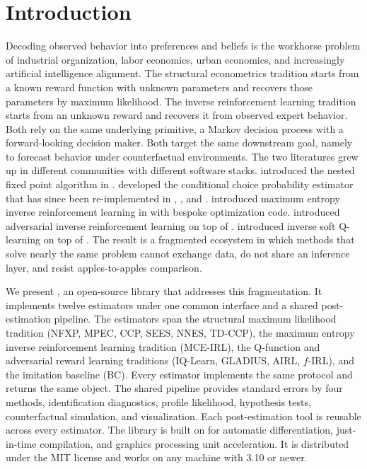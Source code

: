 \section{Introduction} \label{sec:intro}

Decoding observed behavior into preferences and beliefs is the workhorse problem of industrial organization, labor economics, urban economics, and increasingly artificial intelligence alignment. The structural econometrics tradition starts from a known reward function with unknown parameters and recovers those parameters by maximum likelihood. The inverse reinforcement learning tradition starts from an unknown reward and recovers it from observed expert behavior. Both rely on the same underlying primitive, a Markov decision process with a forward-looking decision maker. Both target the same downstream goal, namely to forecast behavior under counterfactual environments. The two literatures grew up in different communities with different software stacks. \citet{rust1987} introduced the nested fixed point algorithm in . \citet{hotz1993} developed the conditional choice probability estimator that has since been re-implemented in , , and . \citet{ziebart2008} introduced maximum entropy inverse reinforcement learning in  with bespoke optimization code. \citet{fu2018} introduced adversarial inverse reinforcement learning on top of . \citet{garg2021} introduced inverse soft Q-learning on top of . The result is a fragmented ecosystem in which methods that solve nearly the same problem cannot exchange data, do not share an inference layer, and resist apples-to-apples comparison.

We present , an open-source  library that addresses this fragmentation. It implements twelve estimators under one common interface and a shared post-estimation pipeline. The estimators span the structural maximum likelihood tradition (NFXP, MPEC, CCP, SEES, NNES, TD-CCP), the maximum entropy inverse reinforcement learning tradition (MCE-IRL), the Q-function and adversarial reward learning traditions (IQ-Learn, GLADIUS, AIRL, $f$-IRL), and the imitation baseline (BC). Every estimator implements the same  protocol and returns the same  object. The shared pipeline provides standard errors by four methods, identification diagnostics, profile likelihood, hypothesis tests, counterfactual simulation, and visualization. Each post-estimation tool is reusable across every estimator. The library is built on  \citep{jax2018github} for automatic differentiation, just-in-time compilation, and graphics processing unit acceleration. It is distributed under the MIT license and works on any machine with  3.10 or newer.

